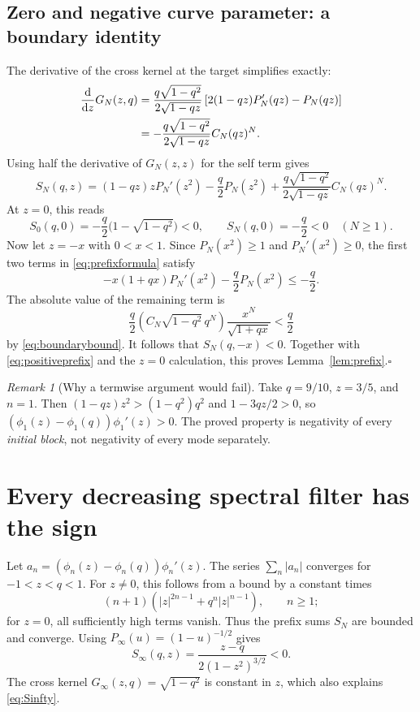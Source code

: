 \documentclass[11pt]{article}
\theoremstyle{remark}
\newtheorem{remark}[theorem]{Remark}
\begin{document}
\subsection{Zero and negative curve parameter: a boundary identity}
The derivative of the cross kernel at the target simplifies exactly:
\begin{align}
 \frac{\mathrm d}{\mathrm dz}G_N(z,q)
 &=\frac{q\sqrt{1-q^2}}{2\sqrt{1-qz}}
 \left[2(1-qz)P_N'(qz)-P_N(qz)\right]\notag\\
 &=-\frac{q\sqrt{1-q^2}}{2\sqrt{1-qz}}C_N(qz)^N.\label{eq:crossderivative}
\end{align}
Using half the derivative of $G_N(z,z)$ for the self term gives
\begin{equation}\label{eq:prefixformula}
 S_N(q,z)=(1-qz)zP_N'(z^2)-\frac q2P_N(z^2)
 +\frac{q\sqrt{1-q^2}}{2\sqrt{1-qz}}C_N(qz)^N.
\end{equation}
At $z=0$, this reads
\[
 S_0(q,0)=-\frac q2\bigl(1-\sqrt{1-q^2}\bigr)<0,
 \qquad S_N(q,0)=-\frac q2<0\quad(N\ge1).
\]
Now let $z=-x$ with $0<x<1$.
Since $P_N(x^2)\ge1$ and $P_N'(x^2)\ge0$, the first two terms in \eqref{eq:prefixformula} satisfy
\[
 -x(1+qx)P_N'(x^2)-\frac q2P_N(x^2)\le-\frac q2.
\]
The absolute value of the remaining term is
\[
 \frac q2\left(C_N\sqrt{1-q^2}\,q^N\right)
 \frac{x^N}{\sqrt{1+qx}}<\frac q2
\]
by \eqref{eq:boundarybound}.
It follows that $S_N(q,-x)<0$.
Together with \eqref{eq:positiveprefix} and the $z=0$ calculation, this proves Lemma~\ref{lem:prefix}.\hfill$\square$

\begin{remark}[Why a termwise argument would fail]
Take $q=9/10$, $z=3/5$, and $n=1$.
Then $(1-qz)z^2>(1-q^2)q^2$ and $1-3qz/2>0$, so
$(\phi_1(z)-\phi_1(q))\phi_1'(z)>0$.
The proved property is negativity of every \emph{initial block}, not negativity of every mode separately.
\end{remark}

\section{Every decreasing spectral filter has the sign}
Let
$a_n=(\phi_n(z)-\phi_n(q))\phi_n'(z)$.
The series $\sum_n|a_n|$ converges for $-1<z<q<1$.
For $z\ne0$, this follows from a bound by a constant times
\[
 (n+1)\left(|z|^{2n-1}+q^n|z|^{n-1}\right),\qquad n\ge1;
\]
for $z=0$, all sufficiently high terms vanish.
Thus the prefix sums $S_N$ are bounded and converge.
Using $P_\infty(u)=(1-u)^{-1/2}$ gives
\begin{equation}\label{eq:Sinfty}
 S_\infty(q,z)=\frac{z-q}{2(1-z^2)^{3/2}}<0.
\end{equation}
The cross kernel $G_\infty(z,q)=\sqrt{1-q^2}$ is constant in $z$, which also explains \eqref{eq:Sinfty}.
\end{document}
